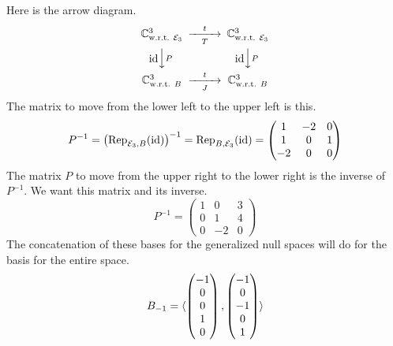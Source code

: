 \begin{exercises}
\begin{answer}
      \begin{exparts}
        \partsitem Here is the arrow diagram.
          \begin{equation*}
            \begin{CD}
              \C^3_\wrt{\stdbasis_3}      @>t>T>    \C^3_\wrt{\stdbasis_3}   \\
                @V\scriptstyle\identity V\scriptstyle PV  
                                    @V\scriptstyle\identity V\scriptstyle PV \\
              \C^3_\wrt{B}                 @>t>J>         \C^3_\wrt{B}
            \end{CD}
          \end{equation*}
          The matrix to move from the lower left to the upper left is this. 
          \begin{equation*}
            P^{-1}=\bigl({\rm Rep}_{{\cal E}_3,B}(\mbox{id})\bigr)^{-1}
                  ={\rm Rep}_{B,{\cal E}_3}(\mbox{id})   
                  =\begin{pmatrix}
                     1  &-2   &0 \\
                     1  &0   &1 \\
                    -2  &0   &0
                   \end{pmatrix}
          \end{equation*}
          The matrix $P$ to move from the upper right to the lower
          right is the inverse of $P^{-1}$.
        \partsitem We want this matrix and its inverse.
          \begin{equation*}
            P^{-1}=
            \begin{pmatrix}
              1  &0  &3  \\
              0  &1  &4  \\
              0  &-2 &0
            \end{pmatrix}
          \end{equation*}
        \partsitem The concatenation of these bases for the 
          generalized null spaces will do for the basis for the
          entire space.
          \begin{equation*}
             B_{-1}=\sequence{\colvec{-1\\ 0 \\  0 \\ 1 \\ 0},
                 \colvec{-1\\ 0 \\ -1 \\ 0 \\ 1}}

\end{equation*}
\end{exparts}
\end{answer}
\end{exercises}
